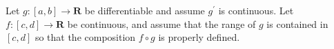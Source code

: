 \begin{exercise} Let $g:[a, b] \rightarrow \mathbf{R}$ be differentiable and assume $g^{\prime}$ is continuous. Let $f:[c, d] \rightarrow \mathbf{R}$ be continuous, and assume that the range of $g$ is contained in $[c, d]$ so that the composition $f \circ g$ is properly defined.
\end{exercise}
\begin{solution}
    \TODO
\end{solution}

